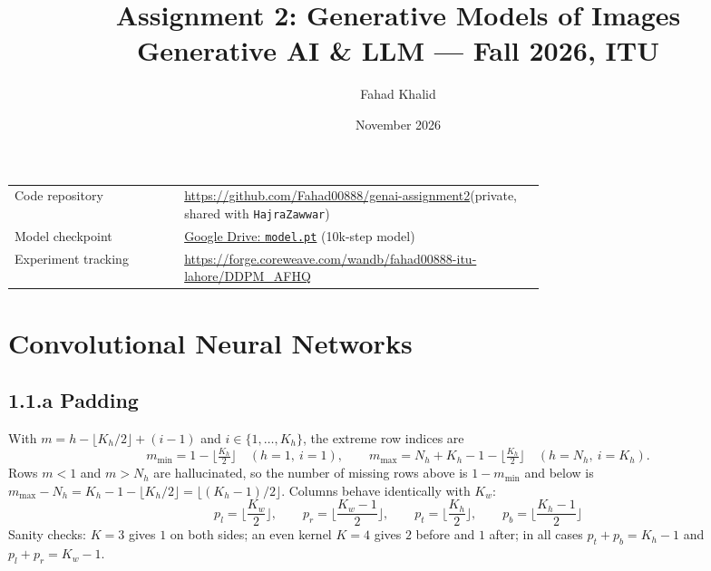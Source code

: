 \documentclass[11pt,a4paper]{article}
\title{\textbf{Assignment 2: Generative Models of Images}\\[2pt]
\large Generative AI \& LLM --- Fall 2026, ITU}
\author{Fahad Khalid}
\date{November 2026}
\begin{document}
\maketitle

\begin{center}
\begin{tabular}{@{}lp{0.68\linewidth}@{}}
\toprule
Code repository & \url{https://github.com/Fahad00888/genai-assignment2}\newline (private, shared with \texttt{HajraZawwar})\\
Model checkpoint & \href{https://drive.google.com/file/d/1W4vOGj6Rkms7JzoKhYAFHsiS_bTbB12t/view?usp=sharing}{Google Drive: \texttt{model.pt}} (10k-step model)\\
Experiment tracking & \url{https://forge.coreweave.com/wandb/fahad00888-itu-lahore/DDPM_AFHQ}\\
\bottomrule
\end{tabular}
\end{center}

\tableofcontents
\newpage

\section{Convolutional Neural Networks}

\subsection*{1.1.a Padding}

With $m = h-\lfloor K_h/2\rfloor+(i-1)$ and $i\in\{1,\dots,K_h\}$, the extreme row indices are
\[
m_{\min} = 1-\Big\lfloor \tfrac{K_h}{2}\Big\rfloor \quad (h=1,\ i=1),
\qquad
m_{\max} = N_h + K_h - 1 - \Big\lfloor \tfrac{K_h}{2}\Big\rfloor \quad (h=N_h,\ i=K_h).
\]
Rows $m<1$ and $m>N_h$ are hallucinated, so the number of missing rows above is $1-m_{\min}$ and below is $m_{\max}-N_h = K_h-1-\lfloor K_h/2\rfloor = \lfloor (K_h-1)/2\rfloor$. Columns behave identically with $K_w$:
\[
\boxed{p_l=\Big\lfloor\frac{K_w}{2}\Big\rfloor,\qquad
p_r=\Big\lfloor\frac{K_w-1}{2}\Big\rfloor,\qquad
p_t=\Big\lfloor\frac{K_h}{2}\Big\rfloor,\qquad
p_b=\Big\lfloor\frac{K_h-1}{2}\Big\rfloor}
\]
Sanity checks: $K=3$ gives $1$ on both sides; an even kernel $K=4$ gives $2$ before and $1$ after; in all cases $p_t+p_b=K_h-1$ and $p_l+p_r=K_w-1$.
\end{document}
